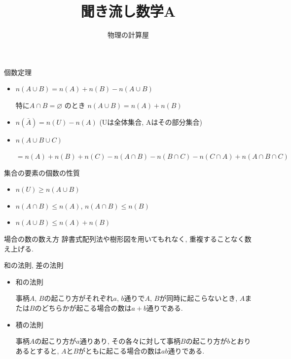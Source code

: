 \documentclass[aspectratio=169, 12pt]{beamer} %
\begin{document}
\title{聞き流し数学A}
\author[物理の計算屋]{物理の計算屋}
\date{}
\frame{\maketitle} %
\begin{frame}{個数定理}
    \begin{itemize}
        \item $n(A\cup B) = n(A) +n(B) -n(A\cup B)$ \par
              特に$A\cap B = \varnothing$ のとき $n(A\cup B) = n(A) +n(B)$
        \item $n(\bar{A})=n(U)-n(A)$ (Uは全体集合, Aはその部分集合)
        \item $n(A\cup B \cup C)$ \par
              $= n(A) +n(B) +n(C)-n(A\cap B) -n(B\cap C)-n(C\cap A)+n(A\cap B \cap C)$
    \end{itemize}
\end{frame}
\begin{frame}{集合の要素の個数の性質}
    \begin{itemize}
        \item $n(U) \geq n(A\cup B)$
        \item $n(A\cap B) \leq n(A)$, $n(A\cap B) \leq n(B)$
        \item $n(A\cup B) \leq n(A)+n(B)$
    \end{itemize}
\end{frame}
\begin{frame}{場合の数の数え方}
    辞書式配列法や樹形図を用いてもれなく, 重複することなく数え上げる.
\end{frame}
\begin{frame}{和の法則, 差の法則}
    \begin{itemize}
        \item 和の法則 \par
              事柄$A$, $B$の起こり方がそれぞれ$a$, $b$通りで$A$, $B$が同時に起こらないとき, $A$または$B$のどちらかが起こる場合の数は$a+b$通りである.
        \item 積の法則 \par
              事柄$A$の起こり方が$a$通りあり, その各々に対して事柄$B$の起こり方が$b$とおりあるとすると, $A$と$B$がともに起こる場合の数は$ab$通りである.
    \end{itemize}
\end{frame}
\end{document}
